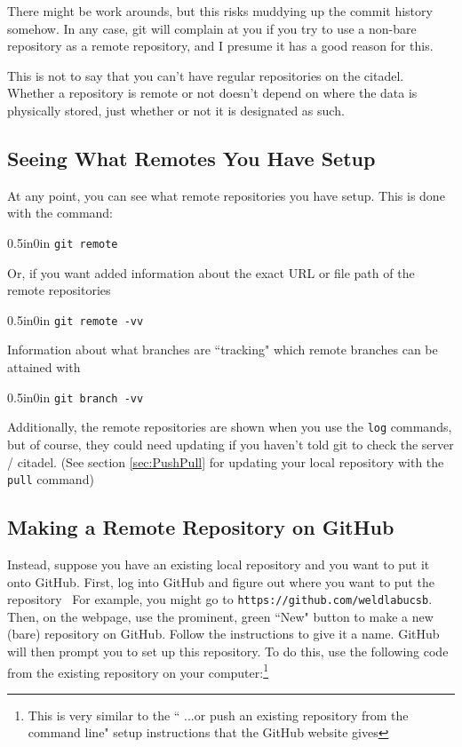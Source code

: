 \documentclass[11pt]{article}
\newcommand{\code}[1]{\begin{adjustwidth}{0.5in}{0in}
    \texttt{#1}
    \end{adjustwidth}}
\begin{document}
There might be work arounds, but this risks muddying up the commit history somehow.  In any case, git will complain at you if you try to use a non-bare repository as a remote repository, and I presume it has a good reason for this.  

This is not to say that you can't have regular repositories on the citadel.  Whether a repository is remote or not doesn't depend on where the data is physically stored, just whether or not it is designated as such.

\subsection{Seeing What Remotes You Have Setup}

At any point, you can see what remote repositories you have setup.  This is done with the command:

\code{git remote}

Or, if you want added information about the exact URL or file path of the remote repositories

\code{git remote -vv}

Information about what branches are ``tracking" which remote branches can be attained with 

\code{git branch -vv}

Additionally, the remote repositories are shown when you use the \texttt{log} commands, but of course, they could need updating if you haven't told git to check the server / citadel.  (See section \ref{sec:PushPull} for updating your local repository with the \texttt{pull} command)

\subsection{Making a Remote Repository on GitHub}

Instead, suppose you have an existing local repository and you want to put it onto GitHub.  First, log into GitHub and figure out where you want to put the repository \textemdash\ For example, you might go to \texttt{https://github.com/weldlabucsb}.  Then, on the webpage, use the prominent, green ``New" button to make a new (bare) repository on GitHub.  Follow the instructions to give it a name.  GitHub will then prompt you to set up this repository.  To do this, use the following code from the existing repository on your computer:\footnote{This is very similar to the `` ...or push an existing repository from the command line" setup instructions that the GitHub website gives}
\end{document}
